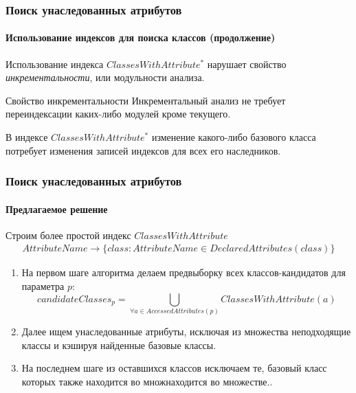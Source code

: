 \documentclass[handout]{beamer}
\begin{document}
\begin{frame}
  \frametitle{Поиск унаследованных атрибутов}
  \framesubtitle{Использование индексов для поиска классов (продолжение)}

  Использование индекса $ClassesWithAttribute^*$ нарушает свойство
  \emph{инкрементальности}, или модульности анализа.

  \begin{block}{Свойство инкрементальности}
    Инкрементальный анализ не требует переиндексации каких-либо модулей
    кроме текущего.
  \end{block}

  В индексе $ClassesWithAttribute^*$ изменение какого-либо базового класса
  потребует изменения записей индексов для всех его наследников.
\end{frame}

\begin{frame}
  \frametitle{Поиск унаследованных атрибутов}
  \framesubtitle{Предлагаемое решение}

  Строим более простой индекс $ClassesWithAttribute$
  \begin{multline*}
    AttributeName \rightarrow \{class: AttributeName \in DeclaredAttributes(class) \}
  \end{multline*}

  \begin{enumerate}
    \item На первом шаге алгоритма делаем предвыборку всех классов-кандидатов для
      параметра $p$:  
      \[
        candidateClasses_p = \bigcup\limits_{\forall{a} \in AccessedAttributes(p)}
        ClassesWithAttribute(a)
      \]

    \item Далее ищем унаследованные атрибуты, исключая из множества неподходящие классы
      и кэшируя найденные базовые классы.

    \item На последнем шаге из оставшихся классов исключаем те, базовый класс
      которых также находится во множнаходится во множестве..
  \end{enumerate}



    
\end{frame}
\end{document}
